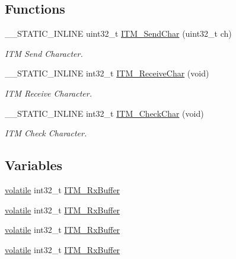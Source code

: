 \subsection*{Functions}
\begin{DoxyCompactItemize}
\item 
\+\_\+\+\_\+\+S\+T\+A\+T\+I\+C\+\_\+\+I\+N\+L\+I\+NE uint32\+\_\+t \hyperlink{group___c_m_s_i_s__core___debug_functions_gac90a497bd64286b84552c2c553d3419e}{I\+T\+M\+\_\+\+Send\+Char} (uint32\+\_\+t ch)
\begin{DoxyCompactList}\small\item\em I\+TM Send Character. \end{DoxyCompactList}\item 
\+\_\+\+\_\+\+S\+T\+A\+T\+I\+C\+\_\+\+I\+N\+L\+I\+NE int32\+\_\+t \hyperlink{group___c_m_s_i_s__core___debug_functions_gac3ee2c30a1ac4ed34c8a866a17decd53}{I\+T\+M\+\_\+\+Receive\+Char} (void)
\begin{DoxyCompactList}\small\item\em I\+TM Receive Character. \end{DoxyCompactList}\item 
\+\_\+\+\_\+\+S\+T\+A\+T\+I\+C\+\_\+\+I\+N\+L\+I\+NE int32\+\_\+t \hyperlink{group___c_m_s_i_s__core___debug_functions_gae61ce9ca5917735325cd93b0fb21dd29}{I\+T\+M\+\_\+\+Check\+Char} (void)
\begin{DoxyCompactList}\small\item\em I\+TM Check Character. \end{DoxyCompactList}\end{DoxyCompactItemize}
\subsection*{Variables}
\begin{DoxyCompactItemize}
\item 
\hyperlink{semihosting_8h_a65e6ad7ed1b130fda2cf7f6a0861fca9}{volatile} int32\+\_\+t \hyperlink{group___c_m_s_i_s__core___debug_functions_ga12e68e55a7badc271b948d6c7230b2a8}{I\+T\+M\+\_\+\+Rx\+Buffer}
\item 
\hyperlink{semihosting_8h_a65e6ad7ed1b130fda2cf7f6a0861fca9}{volatile} int32\+\_\+t \hyperlink{group___c_m_s_i_s__core___debug_functions_ga12e68e55a7badc271b948d6c7230b2a8}{I\+T\+M\+\_\+\+Rx\+Buffer}
\item 
\hyperlink{semihosting_8h_a65e6ad7ed1b130fda2cf7f6a0861fca9}{volatile} int32\+\_\+t \hyperlink{group___c_m_s_i_s__core___debug_functions_ga12e68e55a7badc271b948d6c7230b2a8}{I\+T\+M\+\_\+\+Rx\+Buffer}
\item 
\hyperlink{semihosting_8h_a65e6ad7ed1b130fda2cf7f6a0861fca9}{volatile} int32\+\_\+t \hyperlink{group___c_m_s_i_s__core___debug_functions_ga12e68e55a7badc271b948d6c7230b2a8}{I\+T\+M\+\_\+\+Rx\+Buffer}
\end{DoxyCompactItemize}


